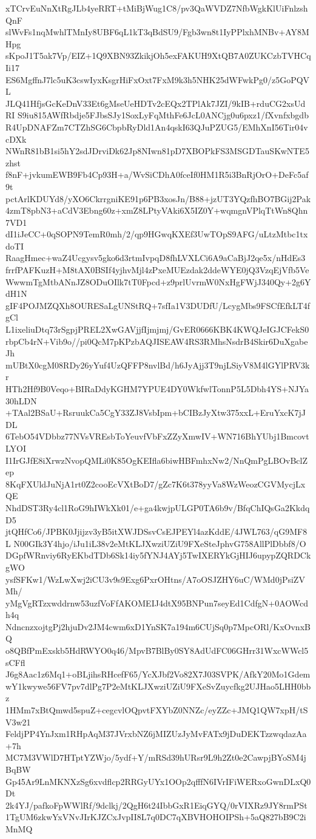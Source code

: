 xTCrvEuNnXtRgJLb4yeRRT+tMiBjWug1C8/pv3QaWVDZ7NfbWgkKlUiFnlzshQnF
slWvFs1nqMwhlTMnIy8UBF6qL1kT3qBdSU9/Fgb3wn8t1IyPPlxhMNBv+AY8MHpg
sKpoJ1T5ak7Vp/EIZ+1Q9XBN93ZkikjOh5exFAKUH9XtQB7A0ZUKCzbTVHCqIi17
ES6MgffnJ7lc5uK3cswIyxKsgrHiFxOxt7FxM9k3h5NHK25dWFwkPg0/z5GoPQVL
JLQ41HfjsGcKeDnV33Et6gMseUeHDTv2cEQx2TPlAk7JZI/9kIB+rduCG2xsUdRI
S9iu815AWfRbdje5FJbsSJy1SoxLyFqMthFe6JcL0ANCjg0u6pxz1/fXvnfxbgdb
R4UpDNAFZm7CTZhSG6CbpbRyDld1An4qskI63QJuPZUG5/EMhXnI56Tir04vcDXk
NWnR81bB1si5hY2sdJDrviDk62Jp8NIwn81pD7XBOPkFS3MSGDTauSKwNTE5zhst
f8nF+jvkumEWB9Fb4Cp93H+a/WvSiCDhA0fceIf0HM1R5i3BnRjOrO+DeFc5af9t
pctArlKDUYd8/yXO6CkrrgniKE91p6PB3xosJn/B88+jzUT3YQzfhBO7BGij2Pak
4zmT8pbN3+aCdV3Ebng60z+xmZ8LPtyVAki6X5IZ0Y+wqmgnVPlqTtWn8Qhn7VD1
dI1iJeCC+0qSOPN9TemR0mh/2/qp9HGwqKXEf3UwTOpS9AFG/uLtzMtbc1txdoTI
RaagHmec+waZ4Ucgysv5gko6d3rtmIvpqD8fhLVXLCi6A9aCaBjJ2qe5x/nHdEs3
frrfPAFKuzH+M8tAX0BSIf4yjhvMjl4zPxeMUEzdak2ddeWYE0jQ3VzqEjVfb5Ve
WwwmTgMtbANnJZ8ODuOIlk7tT0Fpcd+z9prlUvrmW0NxHgFWjJ340Qy+2g6YdH1N
gIF4POJMZQXh8OURESaLgUNStRQ+7sfIa1V3DUDfU/LcygMbs9FSCfEfkLT4fgCl
L1ixeliuDtq73rSgpjPREL2XwGAVjjfIjmjmj/GvER0666KBK4KWQJeIGJCFekS0
rbpCb4rN+Vib9o//pi0QcM7pKPzbAQJISEAW4RS3RMhsNsdrB4Skir6DuXgabeJh
mUBtX0cgM08RDy26yYuf4UzQFFP8nvlBd/h6JyAjj3T9njLSiyV8M4lGYlPRV3kr
HTh2Hf9B0Veqo+BIRaDdyKGHM7YPUE4DY0WkfwlTonnP5L5Dbh4YS+NJYa30hLDN
+TAal2BSaU+RsruukCa5CgY33ZJ8VsbIpm+bCIBzJyXtw375xxL+EruYxcK7jJDL
6TebO54VDbbz77NVsVREsbToYeuvfVbFxZZyXmwIV+WN716BhYUbj1BmcovtLYOI
I1IrGJfE8iXrwzNvopQMLi0K85OgKEIfla6biwHBFmhxNw2/NnQmPgLBOvBclZep
8KqFXUldJuNjA1rt0Z2cooEcVXtBoD7/gZc7K6t378yyVa8WzWeozCGVMycjLxQE
NhdDST3Ry4cl1RoG9hIWkXk01/e+ga4kwjpULGP0TA6b9v/BfqChIQsGa2KkdqD5
jtQHfCo6/JPBK0Jjijzv3yB5itXWJDSsvCsEJPEYl4azKddE/4JWL763/qG9MF8L
N00GIk3Y4hjo/iJu1iL38v2eMtKLJXwziUZiU9FXeSteJphvG758AllPlDbbf8/O
DGpfWRnviy6RyEKbdTDb6Sk14iy5fYNJ4AYj5TwIXERYkGjHIJ6upypZQRDCkgWO
ysfSFKw1/WzLwXwj2iCU3v9s9Exg6PxrOHtns/A7oOSJZHY6uC/WMd0jPsiZVMh/
yMgVgRTzxwddrnw53uzfVoFfAKOMEIJ4dtX95BNPun7seyEd1CdfgN+0AOWcdh4q
NdncnzxojtgPj2hjuDv2JM4cwm6xD1YnSK7a194m6CUjSq0p7MpcORl/KxOvnxBQ
o8QBfPmExskb5HdRWYO0q46/MpvB7BlBy0SY8AdUdFC06GHrr31WxcWWcl5sCFfl
J6g8Aac1z6Mq1+oBLjihsRHcefF65/YcXJbf2Vo82X7J03SVPK/AfkY20Mo1Gdem
wY1kwywe56FV7pv7dlPg7P2eMtKLJXwziUZiU9FXeSvZuycfkg2UJHao5LHH0bbz
1HMm7xBtQmwd5spuZ+cegcvlOQpvtFXYbZ0NNZc/eyZZc+JMQ1QW7xpH/tSV3w21
FeldjPP4YnJxm1RHpAqM37JVrxbNZ6jMIZUzJyMvFATx9jDuDEKTzzwqdazAa+7h
MC7M3VWlD7HTptYZWjo/5ydf+Y/mRSd39hURsr9L9h2Zt0e2CawpjBYoSM4jBqBW
Gp45Ar9LnMKNXzSg6xvdflcp2RRGyUYx1OOp2qfffN6IVrIFiWERxoGwnDLxQ0Dt
2k4YJ/pafkoFpWWlRf/9dclkj/2QgH6t24IbbGxR1EiqGYQ/0rVIXRz9JY8rmPSt
1TgUM6zkwYxVNvJIrKJZCxJvpII8L7q0DC7qXBVHOHOIPSh+5aQ827bB9C2iMnMQ
